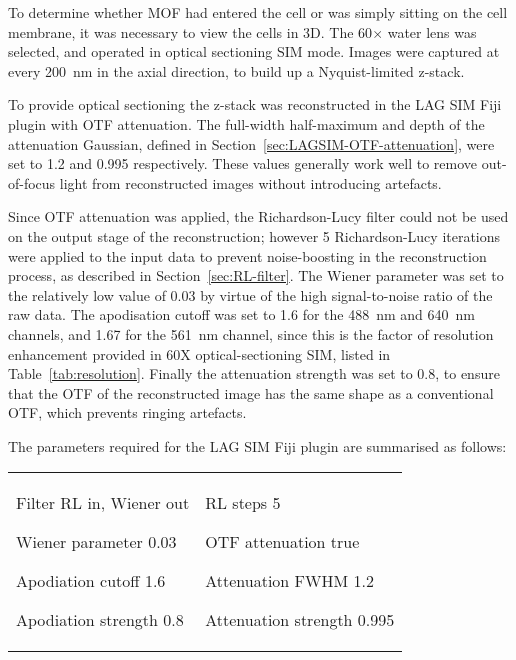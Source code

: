 To determine whether MOF had entered the cell or was simply sitting on the cell membrane, it was necessary to view the cells in 3D.
The 60$\times$ water lens was selected, and operated in optical sectioning SIM mode.
Images were captured at every \SI{200}{\nano\metre} in the axial direction, to build up a Nyquist-limited z-stack.

To provide optical sectioning the z-stack was reconstructed in the LAG SIM Fiji plugin with OTF attenuation.
The full-width half-maximum and depth of the attenuation Gaussian, defined in Section~\ref{sec:LAGSIM-OTF-attenuation}, were set to 1.2 and 0.995 respectively.
These values generally work well to remove out-of-focus light from reconstructed images without introducing artefacts.

Since OTF attenuation was applied, the Richardson-Lucy filter could not be used on the output stage of the reconstruction; however 5 Richardson-Lucy iterations were applied to the input data to prevent noise-boosting in the reconstruction process, as described in Section~\ref{sec:RL-filter}.
The Wiener parameter was set to the relatively low value of 0.03 by virtue of the high signal-to-noise ratio of the raw data.
The apodisation cutoff was set to 1.6 for the \SI{488}{\nano\metre} and \SI{640}{\nano\metre} channels, and 1.67 for the \SI{561}{\nano\metre} channel, since this is the factor of resolution enhancement provided in 60X optical-sectioning SIM, listed in Table~\ref{tab:resolution}.
Finally the attenuation strength was set to 0.8, to ensure that the OTF of the reconstructed image has the same shape as a conventional OTF, which prevents ringing artefacts.

The parameters required for the LAG SIM Fiji plugin are summarised as follows:
\newline
\begin{tabular}{p{}p{}}
\begin{labelling}[margin={Attenuation strength}]
	\item[Filter] RL in, Wiener out
	\item[Wiener parameter] 0.03
	\item[Apodiation cutoff] 1.6
	\item[Apodiation strength] 0.8
\end{labelling} &
\begin{labelling}[margin={Attenuation strength}]
	\item[RL steps] 5
	\item[OTF attenuation] true
	\item[Attenuation FWHM] 1.2
	\item[Attenuation strength] 0.995
\end{labelling}
\end{tabular}

